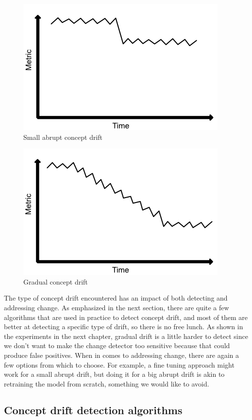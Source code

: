 \documentclass[12pt]{extreport}
\begin{document}
\begin{figure}[!ht]
\centering
\includegraphics[width=0.6\linewidth]{assets/preliminaries/small-abrupt-drift.png}
\caption{Small abrupt concept drift}
\label{fig:small-abrupt-drift}
\end{figure}

\begin{figure}[!ht]
\centering
\includegraphics[width=0.6\linewidth]{assets/preliminaries/gradual-drift.png}
\caption{Gradual concept drift}
\label{fig:gradual-drift}
\end{figure}

The type of concept drift encountered has an impact of both detecting and addressing change. As emphasized in the next section, there are quite a few algorithms that are used in practice to detect concept drift, and most of them are better at detecting a specific type of drift, so there is no free lunch. As shown in the experiments in the next chapter, gradual drift is a little harder to detect since we don't want to make the change detector too sensitive because that could produce false positives. When in comes to addressing change, there are again a few options from which to choose. For example, a fine tuning approach might work for a small abrupt drift, but doing it for a big abrupt drift is akin to retraining the model from scratch, something we would like to avoid.

\subsection{Concept drift detection algorithms} \label{sec:cda}
\end{document}
